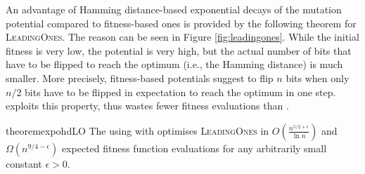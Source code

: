 \documentclass[lettersize,journal]{IEEEtran}
\begin{document}
An advantage of Hamming distance-based exponential decays of the mutation potential
compared to fitness-based ones is provided by the following theorem for \textsc{LeadingOnes}.
The reason can be seen in Figure \ref{fig:leadingones}.  While the initial fitness is very low, the potential is very high, but the actual number of bits that have to be flipped to reach the optimum (i.e., the Hamming distance) is much smaller. More precisely, fitness-based potentials suggest to flip $n$ bits when only $n/2$ bits have to be flipped in expectation to reach the optimum in one step. 
{\expoHD } exploits this property, thus wastes fewer fitness evaluations than \expoF. 

\begin{restatable}{theorem}{expohdLO}\label{thm:expohdLO}
The {\oneoneIA } using \IPHfcm{} with {\expoHD } optimises \textsc{LeadingOnes} in 
$O(\frac{n^{5/2+\epsilon}}{\ln n})$ and $\Omega(n^{9/4-\epsilon})$ expected 
fitness function evaluations for any arbitrarily small constant $\epsilon>0$. 
\end{restatable}
\end{document}

